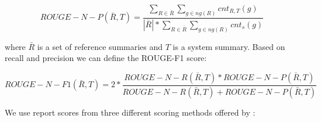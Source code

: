 \documentclass[a4paper,BCOR=10mm]{report}
\numberwithin{lemma}{chapter}
\numberwithin{definition}{chapter}
\begin{document}
\begin{equation}
    \mathit{ROUGE-N-P}(\bar{R}, T) =  \frac{\sum_{R \in \bar{R}} \sum_{g \in \mathit{ng}(R)} \mathit{cnt}_{R,T}(g)}{|\bar{R}| * \sum_{R \in \bar{R}} \sum_{g \in \mathit{ng}(R)} \mathit{cnt}_{s}(g)}
\end{equation}

where $\bar{R}$ is a set of reference summaries and $T$ is a system summary.
Based on recall and precision we can define the ROUGE-F1 score:

\begin{equation}
    \mathit{ROUGE-N-F1}(\bar{R}, T) = 2 * \frac{\mathit{ROUGE-N-R}(\bar{R}, T) * \mathit{ROUGE-N-P}(\bar{R}, T)}{\mathit{ROUGE-N-R}(\bar{R}, T) + \mathit{ROUGE-N-P}(\bar{R}, T)}
\end{equation}

We use report scores from three different scoring methods offered by \citet{tilse}:
\end{document}
